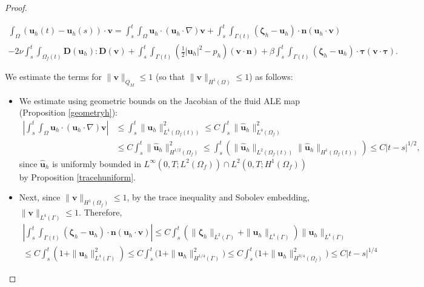 \documentclass[11pt]{article}
\newcommand{\bd}{\boldsymbol}
\theoremstyle{definition}
\begin{document}
\begin{proof}
\begin{small}
\begin{multline*}
\int_{\Omega} (\bd{u}_{h}(t) - \bd{u}_{h}(s)) \cdot \bd{v} = \int_{s}^{t} \int_{\Omega} \bd{u}_{h} \cdot (\bd{u}_{h} \cdot \nabla) \bd{v} + \int_{s}^{t} \int_{\Gamma(t)} (\bd{\zeta}_{h} - \bd{u}_{h}) \cdot \bd{n} (\bd{u}_{h} \cdot \bd{v}) \\
- 2\nu \int_{s}^{t} \int_{\Omega_{f}(t)} \bd{D}(\bd{u}_{h}) : \bd{D}(\bd{v}) + \int_{s}^{t} \int_{\Gamma(t)} \left(\frac{1}{2} |\bd{u}_{h}|^{2} - p_{h}\right) (\bd{v} \cdot \bd{n}) + \beta \int_{s}^{t} \int_{\Gamma(t)} (\bd{\zeta}_{h} - \bd{u}_{h}) \cdot \bd{\tau} (\bd{v} \cdot \bd{\tau}). 
\end{multline*}
\end{small}
We estimate the terms for $\|\bd{v}\|_{Q_{M}} \le 1$ (so that $\|\bd{v}\|_{H^{1}(\Omega)} \le 1$) as follows:
\begin{itemize}
\item We estimate using geometric bounds on the Jacobian of the fluid ALE map (Proposition \ref{geometryh}):
\begin{align*}
\left|\int_{s}^{t} \int_{\Omega} \bd{u}_{h} \cdot (\bd{u}_{h} \cdot \nabla) \bd{v}\right| &\le \int_{s}^{t} \|\bd{u}_{h}\|_{L^{4}(\Omega_{f}(t))}^{2} \le C \int_{s}^{t} \|\hat{\bd{u}}_{h}\|_{L^{4}(\Omega_{f})}^{2} \\
&\le C\int_{s}^{t} \|\hat{\bd{u}}_{h}\|_{H^{1/2}(\Omega_{f})}^{2} \le \int_{s}^{t} \left(\|\hat{\bd{u}}_{h}\|_{L^{2}(\Omega_{f}(t))} \|\hat{\bd{u}}_{h}\|_{H^{1}(\Omega_{f}(t))}\right) \le C|t - s|^{1/2},
\end{align*}
since $\hat{\bd{u}}_{h}$ is uniformly bounded in $L^{\infty}(0, T; L^{2}(\Omega_{f})) \cap L^{2}(0, T; H^{1}(\Omega_{f}))$ by Proposition \ref{tracehuniform}.
\item Next, since $\|\bd{v}\|_{H^{1}(\Omega_{f})} \le 1$, by the trace inequality and Sobolev embedding, $\|\bd{v}\|_{L^{4}(\Gamma)} \le 1$. Therefore,
\begin{multline*}
\left|\int_{s}^{t} \int_{\Gamma(t)} (\bd{\zeta}_{h} - \bd{u}_{h}) \cdot \bd{n} (\bd{u}_{h} \cdot \bd{v})\right| \le C\int_{s}^{t} \left(\|\bd{\zeta}_{h}\|_{L^{2}(\Gamma)} + \|\bd{u}_{h}\|_{L^{4}(\Gamma)}\right) \|\bd{u}_{h}\|_{L^{4}(\Gamma)} \\
\le C\int_{s}^{t} \left(1 + \|\bd{u}_{h}\|_{L^{4}(\Gamma)}^{2}\right) \le C \int_{s}^{t} \Big(1 + \|\bd{u}_{h}\|_{H^{1/4}(\Gamma)}^{2}\Big) \le C \int_{s}^{t} \Big(1 + \|\bd{u}_{h}\|_{H^{3/4}(\Omega_{f})}^{2}\Big) \le C|t - s|^{1/4}

\end{multline*}
\end{itemize}
\end{proof}
\end{document}
